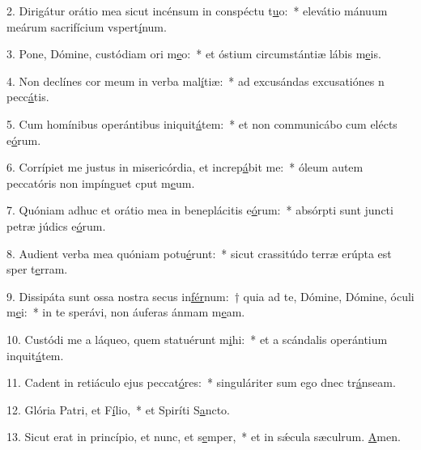 2. Dirigátur orátio mea sicut incénsum in conspéctu t\uline{u}o:~* elevátio mánuum meárum sacrifícium vspert\uline{í}num.\par 
3. Pone, Dómine, custódiam ori m\uline{e}o:~* et óstium circumstántiæ lábis m\uline{e}is.\par 
4. Non declínes cor meum in verba mal\uline{í}tiæ:~* ad excusándas excusatiónes n pecc\uline{á}tis.\par 
5. Cum homínibus operántibus iniquit\uline{á}tem:~* et non communicábo cum elécts e\uline{ó}rum.\par 
6. Corrípiet me justus in misericórdia, et increp\uline{á}bit me:~* óleum autem peccatóris non impínguet cput m\uline{e}um.\par 
7. Quóniam adhuc et orátio mea in beneplácitis e\uline{ó}rum:~* absórpti sunt juncti petræ júdics e\uline{ó}rum.\par 
8. Audient verba mea quóniam potu\uline{é}runt:~* sicut crassitúdo terræ erúpta est sper t\uline{e}rram.\par 
9. Dissipáta sunt ossa nostra secus in\uline{fér}num:~† quia ad te, Dómine, Dómine, óculi m\uline{e}i:~* in te sperávi, non áuferas ánmam m\uline{e}am.\par 
10. Custódi me a láqueo, quem statuérunt m\uline{i}hi:~* et a scándalis operántium inquit\uline{á}tem.\par 
11. Cadent in retiáculo ejus peccat\uline{ó}res:~* singuláriter sum ego dnec tr\uline{á}nseam.\par 
12. Glória Patri, et F\uline{í}lio,~* et Spiríti S\uline{a}ncto.\par 
13. Sicut erat in princípio, et nunc, et s\uline{e}mper,~* et in sǽcula sæculrum. \uline{A}men.\par 
